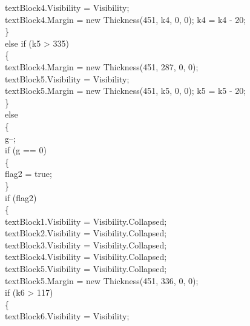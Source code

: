 {{                                textBlock4.Visibility = Visibility;\\
                                textBlock4.Margin = new Thickness(451, k4, 0, 0); k4 = k4 - 20;\\
                            \}\\
                            else if (k5 > 335)\\
                            \{\\
                                textBlock4.Margin = new Thickness(451, 287, 0, 0);\\
                                textBlock5.Visibility = Visibility;\\
                                textBlock5.Margin = new Thickness(451, k5, 0, 0); k5 = k5 - 20;\\
                            \}\\
                            else\\
                            \{\\
                                g--;\\
                                if (g == 0)\\
                                \{\\
                                    flag2 = true;\\
                                \}\\
                                if (flag2)\\
                                \{\\
                                    textBlock1.Visibility = Visibility.Collapsed;\\
                                    textBlock2.Visibility = Visibility.Collapsed;\\
                                    textBlock3.Visibility = Visibility.Collapsed;\\
                                    textBlock4.Visibility = Visibility.Collapsed;\\
                                    textBlock5.Visibility = Visibility.Collapsed;\\
                                    textBlock5.Margin = new Thickness(451, 336, 0, 0);\\
                                    if (k6 > 117)\\
                                    \{\\
                                        textBlock6.Visibility = Visibility;\\
}}
